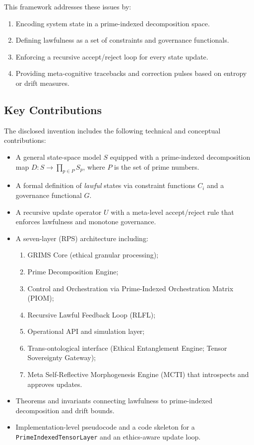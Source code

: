 \documentclass[11pt]{article}
\begin{document}
This framework addresses these issues by:
\begin{enumerate}
  \item Encoding system state in a prime-indexed decomposition space.
  \item Defining lawfulness as a set of constraints and governance functionals.
  \item Enforcing a recursive accept/reject loop for every state update.
  \item Providing meta-cognitive tracebacks and correction pulses based on entropy or drift measures.
\end{enumerate}

\subsection{Key Contributions}

The disclosed invention includes the following technical and conceptual contributions:
\begin{itemize}
  \item A general state-space model \(S\) equipped with a prime-indexed decomposition map \(D : S \to \prod_{p \in P} S_p\), where \(P\) is the set of prime numbers.
  \item A formal definition of \emph{lawful} states via constraint functions \(C_i\) and a governance functional \(G\).
  \item A recursive update operator \(U\) with a meta-level accept/reject rule that enforces lawfulness and monotone governance.
  \item A seven-layer (RPS) architecture including:
    \begin{enumerate}
      \item GRIMS Core (ethical granular processing);
      \item Prime Decomposition Engine;
      \item Control and Orchestration via Prime-Indexed Orchestration Matrix (PIOM);
      \item Recursive Lawful Feedback Loop (RLFL);
      \item Operational API and simulation layer;
      \item Trans-ontological interface (Ethical Entanglement Engine; Tensor Sovereignty Gateway);
      \item Meta Self-Reflective Morphogenesis Engine (MCTI) that introspects and approves updates.
    \end{enumerate}
  \item Theorems and invariants connecting lawfulness to prime-indexed decomposition and drift bounds.
  \item Implementation-level pseudocode and a code skeleton for a \texttt{PrimeIndexedTensorLayer} and an ethics-aware update loop.
\end{itemize}
\end{document}

